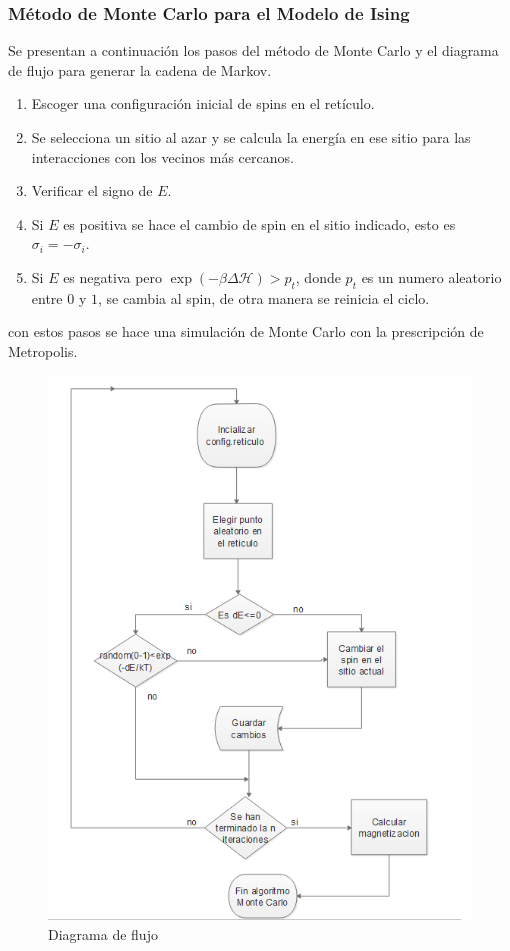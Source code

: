 \documentclass[a4paper]{article}
\begin{document}
\subsubsection{Método de Monte Carlo para el Modelo de Ising}
Se presentan a continuación los pasos del método de Monte Carlo y el diagrama de flujo para generar la cadena de Markov.
\begin{enumerate}
\item Escoger una configuración inicial de spins en el retículo.
\item Se selecciona un sitio al azar y se calcula la energía en ese sitio para las interacciones con los vecinos más cercanos. 
\item Verificar el signo de $E$.
\item Si $E$ es positiva se hace el cambio de spin en el sitio indicado, esto es $\sigma_i=-\sigma_i$.
\item Si $E$ es negativa pero $\exp(-\beta \Delta \mathcal{H})>p_t$, donde $p_t$ es un numero aleatorio entre $0$ y $1$, se cambia al spin, de otra manera se reinicia el ciclo.
\end{enumerate}
con estos pasos se hace una simulación de Monte Carlo con la prescripción de Metropolis.
\pagebreak
\begin{figure}[H]
\begin{center}
\includegraphics[scale=0.9]{FluxDiagram.png} 
\end{center} 
\caption{Diagrama de flujo}
\end{figure}
\end{document}
